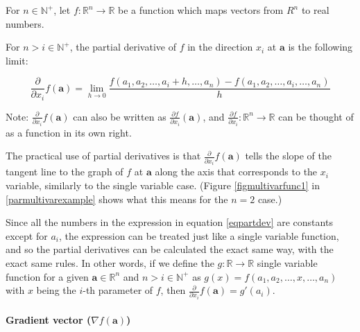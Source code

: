 \documentclass[titlepage]{article}
\begin{document}
          For $n \in \mathbb{N}^+$, let $f : \mathbb{R}^n \rightarrow \mathbb{R}$
          be a function which maps vectors from $R^n$ to real numbers.

          For $n > i \in \mathbb{N}^+$, the partial derivative of $f$ in the
          direction $x_i$ at $\mathbf{a}$ is the following limit:

          \begin{equation} \label{eqpartdev}
            \frac{\partial}{\partial x_i} f(\mathbf{a})
              = \lim_{h \to 0}
                  \frac{
                    f(a_1, a_2, \ldots, a_i + h, \ldots, a_n)
                    - f(a_1, a_2, \ldots, a_i, \ldots, a_n)
                  }{
                    h
                  }
          \end{equation}

          Note: $\frac{\partial}{\partial x_i} f(\mathbf{a})$ can also be
          written as $\frac{\partial f}{\partial x_i} (\mathbf{a})$, and
          $\frac{\partial f}{\partial x_i} : \mathbb{R}^n \rightarrow \mathbb{R}$
          can be thought of as a function in its own right.

          The practical use of partial derivatives is that
          $\frac{\partial}{\partial x_i} f(\mathbf{a})$ tells the slope
          of the tangent line to the graph of $f$ at $\mathbf{a}$ along the
          axis that corresponds to the $x_i$ variable, similarly to the single
          variable case. (Figure \ref{figmultivarfunc1} in
          \ref{parmultivarexample} shows what this means for the $n=2$ case.)

          Since all the numbers in the expression in equation \ref{eqpartdev}
          are constants except for $a_i$, the expression can be treated just
          like a single variable function, and so the partial derivatives can be
          calculated the exact same way, with the exact same rules. In other
          words, if we define the $g : \mathbb{R} \rightarrow \mathbb{R}$
          single variable function for a given $\mathbf{a} \in \mathbb{R}^n$ and
          $n > i \in \mathbb{N}^+$ as
          $g(x) = f(a_1, a_2, \ldots, x, \ldots, a_n)$ with $x$ being the $i$-th
          parameter of $f$, then
          $\frac{\partial}{\partial x_i} f(\mathbf{a}) = g'(a_i)$.

          \paragraph{Gradient vector ($\nabla f(\mathbf{a})$)}
\end{document}
